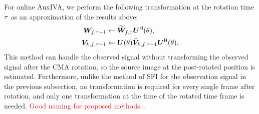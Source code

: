 \documentclass[sip,biber]{now-journal}
\newcommand{\todo}[1]{\textcolor{red}{#1}}
\begin{document}
For online AuxIVA, we perform the following transformation at the rotation time $\tau$ as an approximation of the results above:
\begin{align}
  \bm{W} _{f,\tau - 1} &\gets \widetilde{\bm{W}} _{f,\tau} \bm{U} ^{\mathsf{H}} (\theta), \\
  \bm{V} _{k,f,\tau - 1} &\gets \bm{U} (\theta) \widetilde{\bm{V}} _{k,f,\tau - 1} \bm{U} ^{\mathsf{H}} (\theta).
\end{align}
This method can handle the observed signal without transforming the observed signal after the CMA rotation, so the source image at the post-rotated position is estimated.
Furthermore, unlike the method of SFI for the observation signal in the previous subsection, no transformation is required for every single frame after rotation, and only one transformation at the time of the rotated time frame is needed.
\todo{%
  Good naming for proposed methods...
}
\end{document}

